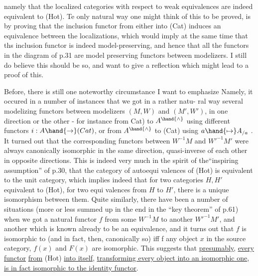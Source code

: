 
namely that the localized categories with respect to weak equivalences are
indeed equivalent to (Hot). Te only natural way one might think of this
to be proved, is by proving that the inclusion functor from either into
(Cat) induces an equivalence between the localizations, which would imply
at the same time that ths inclusion functor is indeed model-preserving,
and hence that all the functors in the diagram of p.31 are model preserving
functors between modelizers. I still do believe this should be so, and
want to give  a reflection which might lead to a proof of this.

Before, there is still one noteworthy circumstance I want to emphasize
Namely, it occured in a number of instances that we got in a rather natu-%
ral way several modelizing functors between  modelizers $(M,W)$ and $(M',W')$,
in one direction or the other - for instance from Cat) to $A^{\hand{\wedge}}$ using
different functors $i: A \hand{\to} (Cat)$, or from $A^{\hand{\wedge}}$ to (Cat) using $a \hand{\mapsto} A_{/a}$ .
It turned out that the corresponding functors between $W^{-1}M$ and $W'^{-1}M'$ were
always canonically isomorphic   in the same direction,  quasi-inverse
of each other   in opposite directions. This is indeed very much in the
spirit of the``inspiring assumption'' of p.30, that the category of autoequi
valences of (Hot) is equivalent to the unit category, which implies indeed
that for two categories $H,H'$ equivalent to (Hot),  for two equi
valences from $H$ to $H'$, there is a unique isomorphism between them. Quite
similarly, there have been a number of situations (more or less summed up
in the end in the ``key theorem'' of p.61) when  we got a natural functor $f$
from some $W^{-1}M$ to another $W'^{-1}M'$, and another  which is known already to be
an equivalence, and it turns out that $f$ is isomorphic to  (and in fact,
then, canonically so) iff f any object $x$ in the source category, $f(x)$
and $F(x)$ are isomorphic. This suggests that \uline{presumably}, \uline{every functor}
\uline{from} (Hot) \uline{into itself}, \uline{transforming every object into an isomorphic one},
\uline{is in fact isomorphic to the identity functor}.


